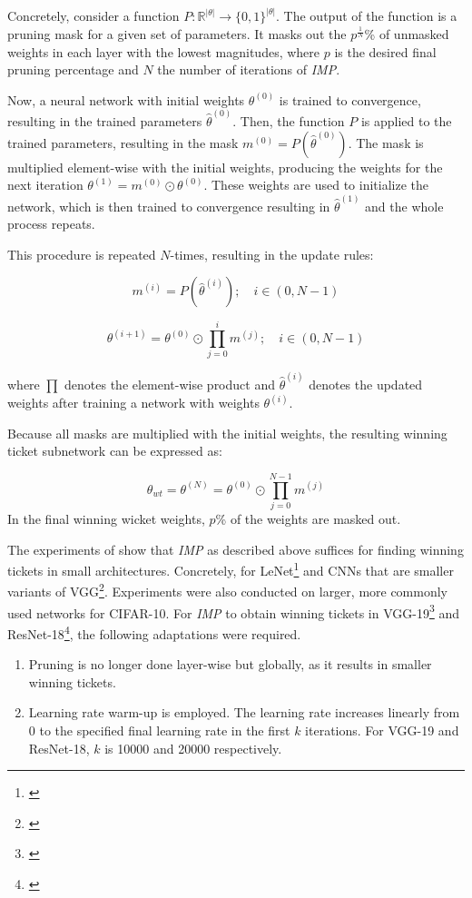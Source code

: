 Concretely, consider a function  $\textit{P} : \mathbb{R}^{|\theta|} \to {\{0,1\}}^{|\theta|}$.
The output of the function is a pruning mask for a given set of parameters.
It masks out the $p^{\frac{1}{N}}$\% of unmasked weights in each layer with the lowest magnitudes, where $p$ is the desired final pruning percentage and $N$ the number of iterations of \textit{IMP}.

Now, a neural network with initial weights $\theta^{(0)}$ is trained to convergence, resulting in the trained parameters $\hat \theta^{(0)}$.
Then, the function $\textit{P}$ is applied to the trained parameters, resulting in the mask $m^{(0)} = \textit{P}(\hat \theta^{(0)})$.
The mask is multiplied element-wise with the initial weights, producing the weights for the next iteration $\theta^{(1)} = m^{(0)} \odot \theta^{(0)}$.
These weights are used to initialize the network, which is then trained to convergence resulting in $\hat \theta^{(1)}$ and the whole process repeats.

This procedure is repeated $N$-times, resulting in the update rules:

\[
m^{(i)} = \textit{P}(\hat \theta^{(i)}); \quad i \in (0,N-1)
\]

\[
\theta^{(i+1)} = \theta^{(0)} \odot \prod_{j=0}^{i}m^{(j)}; \quad i \in (0,N-1)
\] 

where $\prod$ denotes the element-wise product and $\hat \theta^{(i)}$ denotes the updated weights after training a network with weights $\theta^{(i)}$.

Because all masks are multiplied with the initial weights, the resulting winning ticket subnetwork can be expressed as:

\[
\theta_{wt} = \theta^{(N)} = \theta^{(0)} \odot \prod_{j=0}^{N-1}m^{(j)}
\]
In the final winning wicket weights, $p$\% of the weights are masked out.

The experiments of \autocite{LTH} show that \textit{IMP} as described above suffices for finding winning tickets in small architectures.
Concretely, for LeNet\footnote{\cite{cnn}} and CNNs that are smaller variants of VGG\footnote{\cite{SimonyanZisserman}}.
Experiments were also conducted on larger, more commonly used networks for CIFAR-10. For \textit{IMP} to obtain winning tickets in VGG-19\footnote{\cite{Liu19}} and ResNet-18\footnote{\cite{ResidualConnect}}, the following adaptations were required. 
\begin{enumerate}
  \item  Pruning is no longer done layer-wise but globally, as it results in smaller winning tickets. 
  \item Learning rate warm-up is employed. The learning rate increases linearly from 0 to the specified final learning rate in the first $k$ iterations. For VGG-19 and ResNet-18, $k$ is 10000 and 20000 respectively.
\end{enumerate}

